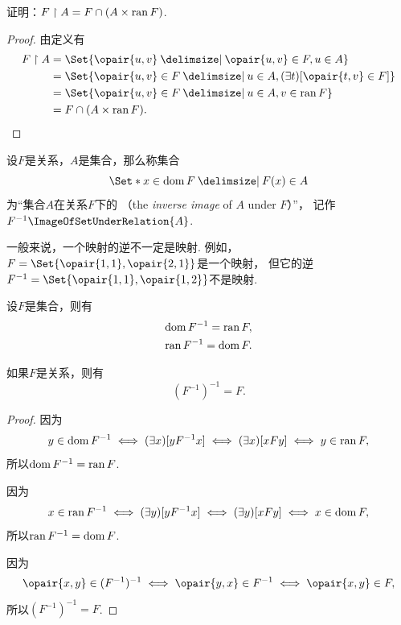 \begin{example}
证明：\(F \upharpoonright A = F \cap (A \times \operatorname{ran} F)\).
\begin{proof}
由定义有\begin{align*}
	F \SetRestrict A
	&= \Set{
		\opair{u,v}
		\given
		\opair{u,v} \in F,
		u \in A
	} \\
	&= \Set{
		\opair{u,v} \in F
		\given
		u \in A,
		(\exists t)[\opair{t,v} \in F]
	} \\
	&= \Set{
		\opair{u,v} \in F
		\given
		u \in A,
		v \in \ran F
	} \\
	&= F \cap (A \times \ran F).
	\qedhere
\end{align*}
\end{proof}
\end{example}

\begin{definition}
设\(F\)是关系，\(A\)是集合，那么称集合\begin{equation*}
	\Set*{ x \in \dom F \given F(x) \in A }
\end{equation*}为“集合\(A\)在关系\(F\)下的%
（the \emph{inverse image} of \(A\) under \(F\)）”，
记作\(F^{-1}\ImageOfSetUnderRelation{A}\).
\end{definition}

一般来说，一个映射的逆不一定是映射.
例如，\(F=\Set{ \opair{1,1},\opair{2,1} }\)是一个映射，
但它的逆\(F^{-1}=\Set{ \opair{1,1},\opair{1,2} }\)不是映射.

\begin{theorem}\label{theorem:集合论.关系的逆的定义域值域以及关系的二重逆}
设\(F\)是集合，则有\begin{gather}
	\operatorname{dom} F^{-1} = \operatorname{ran} F, \\
	\operatorname{ran} F^{-1} = \operatorname{dom} F.
\end{gather}

如果\(F\)是关系，则有\begin{equation}
	(F^{-1})^{-1} = F.
\end{equation}
\begin{proof}
因为\begin{equation*}
	y \in \operatorname{dom} F^{-1}
	\iff
	(\exists x)[yF^{-1}x]
	\iff
	(\exists x)[xFy]
	\iff
	y \in \operatorname{ran} F,
\end{equation*}
所以\(\operatorname{dom} F^{-1} = \operatorname{ran} F\).

因为\begin{equation*}
	x \in \operatorname{ran} F^{-1}
	\iff
	(\exists y)[yF^{-1}x]
	\iff
	(\exists y)[xFy]
	\iff
	x \in \operatorname{dom} F,
\end{equation*}
所以\(\operatorname{ran} F^{-1} = \operatorname{dom} F\).

因为\begin{equation*}
	\opair{x,y} \in (F^{-1})^{-1}
	\iff
	\opair{y,x} \in F^{-1}
	\iff
	\opair{x,y} \in F,
\end{equation*}
所以\((F^{-1})^{-1} = F\).
\end{proof}
\end{theorem}

